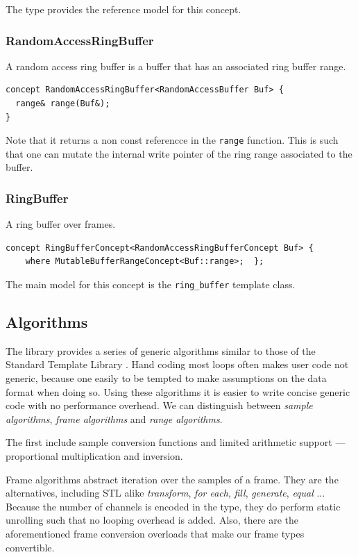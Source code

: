 The  type provides the reference model for
this concept.

\subsubsection{RandomAccessRingBuffer}

A random access ring buffer is a buffer that has an associated ring
buffer range.

\begin{lstlisting}
concept RandomAccessRingBuffer<RandomAccessBuffer Buf> {
  range& range(Buf&);
}
\end{lstlisting}

Note that it returns a non const referencce in the \texttt{range}
function. This is such that one can mutate the internal write pointer
of the ring range associated to the buffer.

\subsubsection{RingBuffer}

A ring buffer over frames.
\begin{lstlisting}
concept RingBufferConcept<RandomAccessRingBufferConcept Buf> {
    where MutableBufferRangeConcept<Buf::range>;  };
\end{lstlisting}

The main model for this concept is the \texttt{ring\_buffer} template
class.

\subsection{Algorithms}

 The library
provides a series of generic algorithms similar to those of the
Standard Template Library \cite{stepanov94stl}. Hand coding most loops
often makes user code not generic, because one easily to be tempted to
make assumptions on the data format when doing so. Using these
algorithms it is easier to write concise generic code with no
performance overhead.  We can distinguish between \emph{sample
  algorithms}, \emph{frame algorithms} and \emph{range algorithms}.

The first include sample conversion functions and limited arithmetic
support --- proportional multiplication and inversion.

Frame algorithms abstract iteration over the samples of a
frame. They are the  alternatives, including STL alike
\emph{transform}, \emph{for each}, \emph{fill}, \emph{generate},
\emph{equal} ... Because the number of channels is encoded in the
type, they do perform static unrolling such that no looping overhead
is added. Also, there are the aforementioned frame conversion
overloads that make our frame types convertible.


